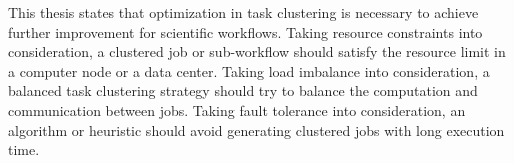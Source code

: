 This thesis states that optimization in task clustering is necessary to achieve further improvement for scientific workflows. Taking resource constraints into consideration, a clustered job or sub-workflow should satisfy the resource limit in a computer node or a data center. Taking load imbalance into consideration, a balanced task clustering strategy should try to balance the computation and communication between jobs. Taking fault tolerance into consideration, an algorithm or heuristic should avoid generating clustered jobs with long execution time. 





